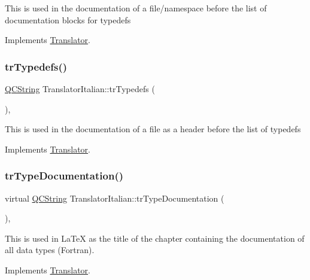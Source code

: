 This is used in the documentation of a file/namespace before the list of documentation blocks for typedefs 

Implements \mbox{\hyperlink{class_translator}{Translator}}.

\mbox{\label{class_translator_italian_abc9e900ace289b1fa2eaa1e3744b61d6}} 
\subsubsection{\texorpdfstring{trTypedefs()}{trTypedefs()}}
{\footnotesize\ttfamily \mbox{\hyperlink{class_q_c_string}{Q\+C\+String}} Translator\+Italian\+::tr\+Typedefs (\begin{DoxyParamCaption}{ }\end{DoxyParamCaption})\hspace{0.3cm}{\ttfamily [inline]}, {\ttfamily [virtual]}}

This is used in the documentation of a file as a header before the list of typedefs 

Implements \mbox{\hyperlink{class_translator}{Translator}}.

\mbox{\label{class_translator_italian_a0a2e11ea861fed4174f8a9095cf3d763}} 
\subsubsection{\texorpdfstring{trTypeDocumentation()}{trTypeDocumentation()}}
{\footnotesize\ttfamily virtual \mbox{\hyperlink{class_q_c_string}{Q\+C\+String}} Translator\+Italian\+::tr\+Type\+Documentation (\begin{DoxyParamCaption}{ }\end{DoxyParamCaption})\hspace{0.3cm}{\ttfamily [inline]}, {\ttfamily [virtual]}}

This is used in La\+TeX as the title of the chapter containing the documentation of all data types (Fortran). 

Implements \mbox{\hyperlink{class_translator}{Translator}}.

\mbox{\label{class_translator_italian_a19f7a03cdd685b46a7e1ef4449035b39}} 
